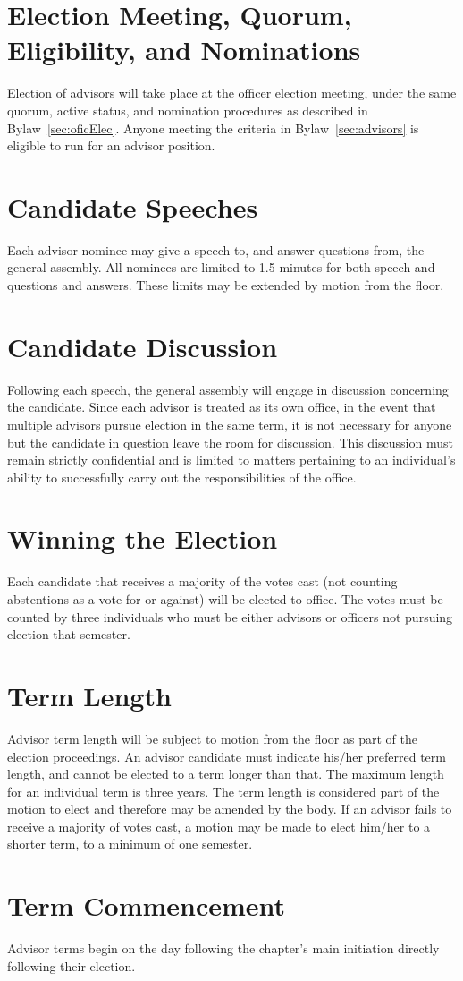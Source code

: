 \section{Election Meeting, Quorum,  Eligibility, and Nominations} Election of advisors will take place at the officer election meeting, under the same quorum,  active status, and nomination procedures  as described in Bylaw~\ref{sec:oficElec}. Anyone meeting the criteria in Bylaw~\ref{sec:advisors} is eligible to run for an advisor position.
\section{Candidate Speeches} Each advisor nominee may give a speech to, and answer questions from, the general assembly. All nominees are limited to 1.5 minutes for both speech and questions and answers. These limits may be extended by motion from the floor.
\section{Candidate Discussion} Following each speech, the general assembly will engage in discussion concerning the candidate. Since each advisor is treated as its own office, in the event that multiple advisors pursue election in the same term, it is not necessary for anyone but the candidate in question leave the room for discussion. This discussion must remain strictly confidential and is limited to matters pertaining to an individual's ability to successfully carry out the responsibilities of the office. 
\section{Winning the Election} Each candidate that receives a majority of the votes cast (not counting abstentions as a vote for or against) will be elected to office. The votes must be counted by three individuals who must be either advisors or officers not pursuing election that semester.
\section{Term Length} \label{sec:advisorLength} Advisor term length will be subject to motion from the floor as part of the election proceedings. An advisor candidate must indicate his/her preferred term length, and cannot be elected to a term longer than that. The maximum length for an individual term is three years. The term length is considered part of the motion to elect and therefore may be amended by the body. If an advisor fails to receive a majority of votes cast, a motion may be made to elect him/her to a shorter term, to a minimum of one semester.
\section{Term Commencement} Advisor terms begin on the day following the chapter's main initiation directly following their election.